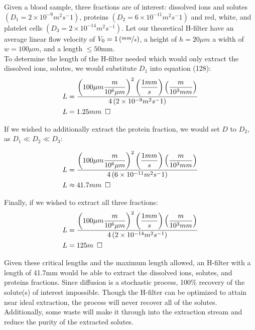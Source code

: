 \documentclass[titlepage]{article}
\begin{document}
\noindent Given a blood sample, three fractions are of interest: dissolved ions and solutes $\left(D_{1}=2\times{10^{-9}}m^2{s^-1}\right)$, proteins $\left(D_{2}=6\times{10^{-11}}m^2{s^-1}\right)$ and red, white, and platelet cells $\left(D_{3}=2\times10^{-14}m^2{s^{-1}}\right)$. Let our theoretical H-filter have an average linear flow velocity of $V_{0}=1\left(\displaystyle\nicefrac{mm}{s}\right)$, a height of $h=20\mu{m}$ a width of $w=100\mu{m}$, and a length $\leq 50$mm. \\

\newpage
\noindent To determine the length of the H-filter needed which would only extract the dissolved ions, solutes, we would substitute $D_{1}$ into equation (128):
\begin{align}
    L &= \displaystyle\frac{\left(100\mu{m}\displaystyle\frac{m}{10^{6}\mu{m}}\right)^2\left(\displaystyle\frac{1mm}{s}\right)\left(\displaystyle\frac{m}{10^3{mm}}\right)}{4\left(2\times{10^{-9}}m^2{s^-1}\right)} \\
    L &= 1.25mm \hspace*{5pt}\square
\end{align}

\noindent If we wished to additionally extract the protein fraction, we would set $D$ to $D_{2}$, as $D_{1}\ll{D_{2}}\ll{D_{3}}$:

\begin{align}
    L &= \displaystyle\frac{\left(100\mu{m}\displaystyle\frac{m}{10^{6}\mu{m}}\right)^2\left(\displaystyle\frac{1mm}{s}\right)\left(\displaystyle\frac{m}{10^3{mm}}\right)}{4\left(6\times{10^{-11}}m^2{s^-1}\right)} \\
    L &\approx 41.7mm \hspace*{5pt}\square
\end{align}


\noindent Finally, if we wished to extract all three fractions: 
\begin{align}
    L &= \displaystyle\frac{\left(100\mu{m}\displaystyle\frac{m}{10^{6}\mu{m}}\right)^2\left(\displaystyle\frac{1mm}{s}\right)\left(\displaystyle\frac{m}{10^3{mm}}\right)}{4\left(2\times10^{-14}m^2{s^{-1}}\right)} \\
    L &= 125m \hspace*{5pt}\square
\end{align}

\noindent Given these critical lengths and the maximum length allowed, an H-filter with a length of 41.7mm would be able to extract the dissolved ions, solutes, and proteins fractions. Since diffusion is a stochastic process, 100\% recovery of the solute(s) of interest impossible. Though the H-filter can be optimized to attain near ideal extraction, the process will never recover all of the solutes. Additionally, some waste will make it through into the extraction stream and reduce the purity of the extracted solutes. 
\end{document}

